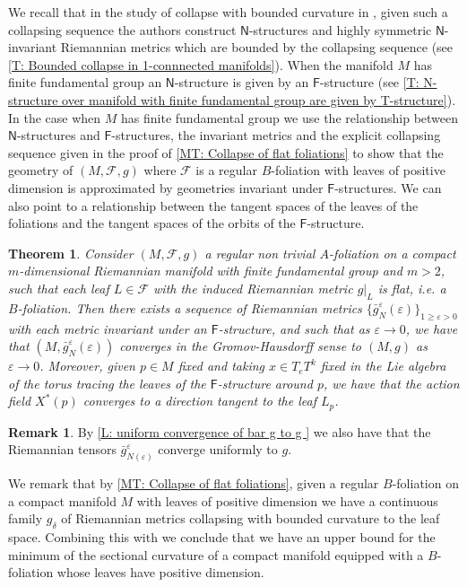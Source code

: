 \documentclass[12pt,a4paper,reqno]{amsart}
\newtheorem{mtheorem}{Theorem}
\theoremstyle{definition}
\newtheorem{rmk}[theorem]{Remark}
\numberwithin{equation}{section}
\newcommand{\fol}{\mathcal{F}}
\newcommand{\F}{\mathsf{F}}
\newcommand{\Ns}{\mathsf{N}}
\begin{document}
We recall that in the study of collapse  with bounded  curvature in \cite{CheegerFukayaGromov1992}, given such a collapsing sequence the authors construct $\Ns$-structures and highly symmetric $\Ns$-invariant Riemannian metrics which are bounded by the collapsing sequence (see \th\ref{T: Bounded collapse in 1-connnected manifolds}). When the manifold $M$ has finite fundamental group an $\Ns$-structure is given by an $\F$-structure (see \th\ref{T: N-structure over manifold with finite fundamental group are given by T-structure}). 
In the case when $M$ has finite fundamental group we use the relationship between $\Ns$-structures and $\F$-structures, the invariant metrics and the explicit collapsing sequence given in the proof of \th\ref{MT: Collapse of flat foliations} to show that the geometry of  $(M,\fol,g)$ where $\fol$ is a regular $B$-foliation with leaves of positive dimension is approximated by geometries invariant under $\F$-structures. 
We can also point to a relationship between the tangent spaces of the leaves of the foliations and the tangent spaces of the orbits of the $\F$-structure.

\begin{mtheorem}\th\label{MT: Approximating flat foliations by N-structures}
Consider $(M,\fol,g)$ a regular non trivial $A$-foliation on a compact $m$-dimensional Riemannian manifold with finite fundamental group and $m>2$, such that each leaf $L\in \fol$ with the induced Riemannian metric $g|_L$ is flat, i.e. a $B$-foliation. Then there exists a sequence of Riemannian metrics $\{\bar{g}^\varepsilon_N(\varepsilon)\}_{1\geq\varepsilon>0}$ with each metric invariant under an $\F$-structure, and such that as $\varepsilon\to 0$, we have that $(M,\bar{g}^\varepsilon_N(\varepsilon))$ converges in the Gromov-Hausdorff sense to $(M,g)$ as $\varepsilon\to 0$. Moreover, given $p\in M$ fixed and taking $x\in T_e T^k$ fixed in the Lie algebra of the torus tracing the leaves of the $\F$-structure around $p$, we have that the action field $X^\ast(p)$ converges to a direction tangent to the leaf $L_p$.
\end{mtheorem}

\begin{rmk}
By \th\ref{L: uniform convergence of bar g to g } we also have that the Riemannian tensors $\bar{g}_{N(\varepsilon)}^\varepsilon$ converge uniformly to $g$.
\end{rmk}

We remark that by \th\ref{MT: Collapse of flat foliations}, given a regular $B$-foliation on a compact manifold $M$ with leaves of positive dimension  we have a continuous family $g_\delta$ of Riemannian metrics collapsing with bounded curvature to the leaf space. Combining this with  \cite[Theorem 0.4]{PetruninRongTuschmann1999} we conclude that we  have an upper bound for the minimum of the sectional curvature of a compact manifold equipped with a $B$-foliation whose leaves have positive dimension. 
\end{document}

